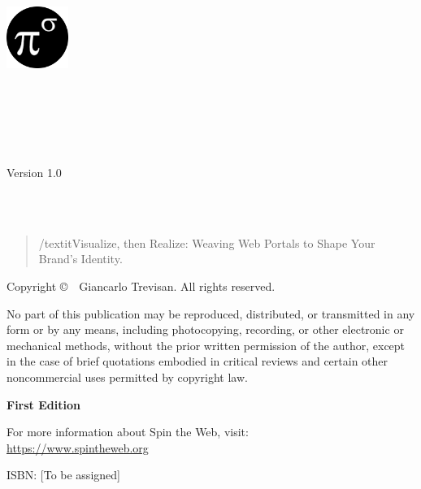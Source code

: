 \begin{titlepage}
\centering

\includegraphics[width=0.15\textwidth]{figures/logo.png}\\[1cm]

\vspace*{1cm}

\makeatletter
{\Huge\bfseries \@title\\[0.5cm]}

\ifx\@subtitle\@empty\else
{\Large \@subtitle\\[1.5cm]}
\fi

{\large\textsc{\@author}\\[2cm]}

{\large Version 1.0\\[0.5cm]}
{\large \@date\\[2cm]}
\makeatother

\vfill

{\large \organization\\[0.5cm]}

\begin{quote}
\centering
/textit{Visualize, then Realize: Weaving Web Portals to Shape Your Brand’s Identity.}
\end{quote}

\end{titlepage}

\thispagestyle{empty}
\null\vfill
\noindent
\thispagestyle{empty}
\vspace*{\fill}
\begin{center}
\small
Copyright \copyright\ \the\year\ Giancarlo Trevisan. All rights reserved.

\medskip

\noindent
No part of this publication may be reproduced, distributed, or transmitted in any form or by any means, including photocopying, recording, or other electronic or mechanical methods, without the prior written permission of the author, except in the case of brief quotations embodied in critical reviews and certain other noncommercial uses permitted by copyright law.

\medskip

\noindent
\textbf{First Edition}

\medskip

\noindent
For more information about Spin the Web, visit: \\
\url{https://www.spintheweb.org}

\medskip

\noindent
ISBN: [To be assigned]
\end{center}

\clearpage
